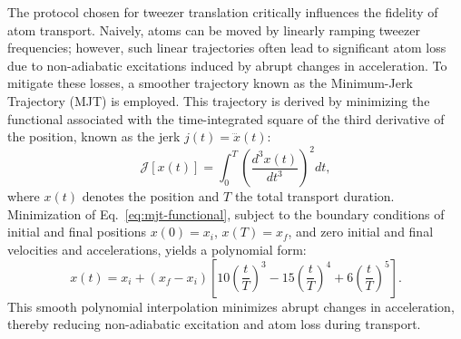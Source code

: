 The protocol chosen for tweezer translation critically influences the fidelity of atom transport. Naively, atoms can be moved by linearly ramping tweezer frequencies; however, such linear trajectories often lead to significant atom loss due to non-adiabatic excitations induced by abrupt changes in acceleration. To mitigate these losses, a smoother trajectory known as the Minimum-Jerk Trajectory (MJT) is employed. This trajectory is derived by minimizing the functional associated with the time-integrated square of the third derivative of the position, known as the jerk $j(t) = \dddot{x}(t)$:
\begin{equation}
\mathcal{J}[x(t)] = \int_{0}^{T} \left(\frac{d^3 x(t)}{dt^3}\right)^2 dt,
\label{eq:mjt-functional}
\end{equation}
where $x(t)$ denotes the position and $T$ the total transport duration. Minimization of Eq.~\eqref{eq:mjt-functional}, subject to the boundary conditions of initial and final positions $x(0) = x_i$, $x(T) = x_f$, and zero initial and final velocities and accelerations, yields a polynomial form:
\begin{equation}
x(t) = x_i + (x_f - x_i)\left[10\left(\frac{t}{T}\right)^3 - 15\left(\frac{t}{T}\right)^4 + 6\left(\frac{t}{T}\right)^5\right].
\label{eq:mjt-solution}
\end{equation}
This smooth polynomial interpolation minimizes abrupt changes in acceleration, thereby reducing non-adiabatic excitation and atom loss during transport.

